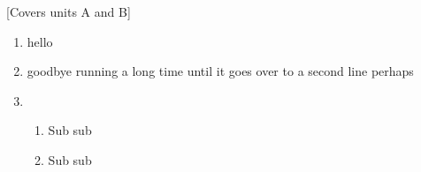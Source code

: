 \documentclass{outn}
\begin{document}
\maketitle

%
%
%
%
%
%


[Covers units A and B]

\label{myqnnum}

\begin{enumerate}
\item hello
\item goodbye running a long time until it goes over to a second line perhaps
\item 
\begin{enumerate}
\item Sub sub
\item Sub sub
\end{enumerate}
\end{enumerate}
\end{document}
